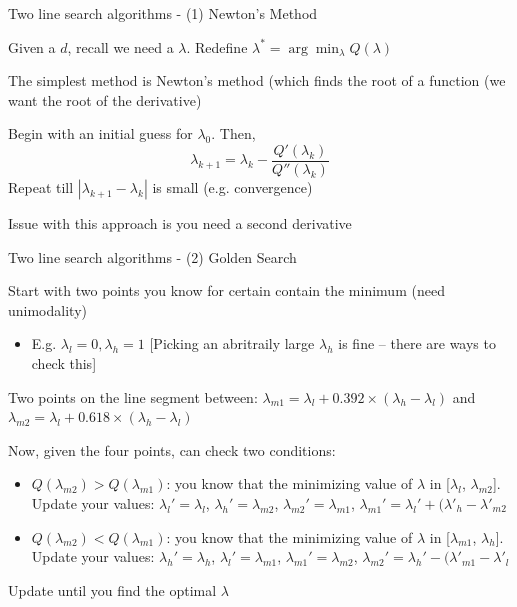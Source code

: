 \documentclass[notes,11pt, aspectratio=169]{beamer}
\newenvironment{wideitemize}{\itemize\addtolength{\itemsep}{10pt}}{\enditemize}
\begin{document}
  \begin{frame}{Two line search algorithms - (1) Newton's Method}
    \begin{wideitemize}
    \item Given a $d$, recall we need a $\lambda$. Redefine $\lambda^{*} = \arg\min_{\lambda} Q(\lambda)$
    \item The simplest method is Newton's method (which finds the root
      of a function (we want the root of the derivative)
    \item Begin with an initial guess for $\lambda_{0}$. Then,
      $$\lambda_{k+1} = \lambda_{k} - \frac{Q'(\lambda_{k})}{Q''(\lambda_{k})}$$
      Repeat till $|\lambda_{k+1}-\lambda_{k}|$ is small
      (e.g. convergence)
    \item Issue with this approach is you need a second derivative
    \end{wideitemize}
  \end{frame}

  \begin{frame}{Two line search algorithms - (2) Golden Search}
    \begin{wideitemize}
    \item Start with two points you know for certain contain the minimum (need unimodality)
      \begin{itemize}
      \item E.g. $\lambda_{l} = 0, \lambda_{h} =
        1$ [Picking an abritraily large $\lambda_{h}$ is fine -- there
        are ways to check this]
      \end{itemize}
    \item Two points on the line segment between: $\lambda_{m1} = \lambda_{l} + 0.392 \times (\lambda_{h} - \lambda_{l})$ and $\lambda_{m2} = \lambda_{l} + 0.618 \times (\lambda_{h} - \lambda_{l})$
    \item Now, given the four points, can check two conditions:
      \begin{itemize}
      \item $Q(\lambda_{m2}) > Q(\lambda_{m1})$: you know that the minimizing value of  $\lambda $ in [$\lambda_{l}$, $\lambda_{m2}$]. Update your values:  $\lambda_{l}' = \lambda_{l}$, $\lambda_{h}' = \lambda_{m2}$, $\lambda_{m2}' = \lambda_{m1}$, $\lambda_{m1}' =  \lambda_{l}' + (\lambda'_{h} - \lambda'_{m2}$
      \item $Q(\lambda_{m2}) < Q(\lambda_{m1})$: you know that the minimizing value of  $\lambda $ in [$\lambda_{m1}$, $\lambda_{h}$]. Update your values:  $\lambda_{h}' = \lambda_{h}$, $\lambda_{l}' = \lambda_{m1}$, $\lambda_{m1}' = \lambda_{m2}$, $\lambda_{m2}' =  \lambda_{h}' - (\lambda'_{m1} - \lambda'_{l}$
      \end{itemize}
    \item Update until you find the optimal $\lambda$
    \end{wideitemize}
  \end{frame}
\end{document}
